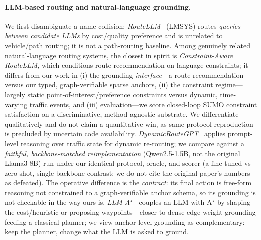 \paragraph{LLM-based routing and natural-language grounding.}
We first disambiguate a name collision: \emph{RouteLLM}~\cite{ong2024routellm} (LMSYS) routes
\emph{queries between candidate LLMs} by cost/quality preference and is unrelated to vehicle/path
routing; it is not a path-routing baseline. Among genuinely related natural-language routing systems, the
closest in spirit is \emph{Constraint-Aware RouteLLM}, which conditions route recommendation on language
constraints; it differs from our work in (i) the grounding \emph{interface}---a route recommendation
versus our typed, graph-verifiable sparse anchors, (ii) the constraint regime---largely static
point-of-interest/preference constraints versus dynamic, time-varying traffic events, and (iii)
evaluation---we score closed-loop SUMO constraint satisfaction on a discriminative, method-agnostic
substrate. We differentiate qualitatively and do not claim a quantitative win, as same-protocol
reproduction is precluded by uncertain code availability. \emph{DynamicRouteGPT}~\cite{drgpt2024} applies
prompt-level reasoning over traffic state for dynamic re-routing; we compare against a \emph{faithful,
backbone-matched reimplementation} (Qwen2.5-1.5B, not the original Llama3-8B) run under our identical
protocol, oracle, and scorer (a fine-tuned-vs-zero-shot, single-backbone contrast; we do not cite the
original paper's numbers as defeated). The operative difference is the \emph{contract}: its final action
is free-form reasoning not constrained to a graph-verifiable anchor schema, so its grounding is not
checkable in the way ours is. \emph{LLM-A$^\star$}~\cite{meng2024llmastar} couples an LLM with A$^\star$
by shaping the cost/heuristic or proposing waypoints---closer to dense edge-weight grounding feeding a
classical planner; we view anchor-level grounding as complementary: keep the planner, change what the
LLM is asked to ground.

